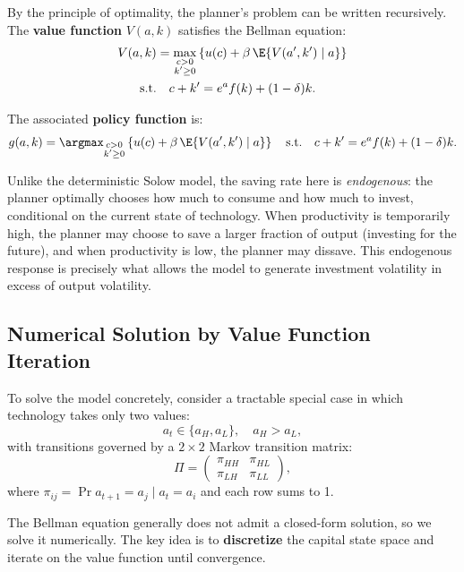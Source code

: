 By the principle of optimality, the planner's problem can be written recursively. The \textbf{value function} $V(a, k)$ satisfies the Bellman equation:
$$
\begin{aligned}
    V(a, k) & =  \max_{\substack{c > 0 \\ k' \geq 0}} \left\{ u(c) + \beta\, \E{V(a', k') \mid a} \right\}\\
\text{s.t.} &  \quad c + k' = e^a f(k) + (1-\delta) k.
\end{aligned}
$$

\noindent The associated \textbf{policy function} is:
$$
g(a, k) = \argmax_{\substack{c > 0 \\ k' \geq 0}} \left\{ u(c) + \beta\, \E{V(a', k') \mid a} \right\} \quad \text{s.t.} \quad c + k' = e^a f(k) + (1-\delta) k.
$$

Unlike the deterministic Solow model, the saving rate here is \textit{endogenous}: the planner optimally chooses how much to consume and how much to invest, conditional on the current state of technology. When productivity is temporarily high, the planner may choose to save a larger fraction of output (investing for the future), and when productivity is low, the planner may dissave. This endogenous response is precisely what allows the model to generate investment volatility in excess of output volatility.

\subsection{Numerical Solution by Value Function Iteration}

To solve the model concretely, consider a tractable special case in which technology takes only two values:
$$
a_t \in \{a_H, a_L\}, \quad a_H > a_L,
$$
with transitions governed by a $2 \times 2$ Markov transition matrix:
$$
\Pi = \begin{pmatrix} \pi_{HH} & \pi_{HL} \\ \pi_{LH} & \pi_{LL} \end{pmatrix},
$$
where $\pi_{ij} = \Pr{a_{t+1} = a_j \mid a_t = a_i}$ and each row sums to 1.


The Bellman equation generally does not admit a closed-form solution, so we solve it numerically. The key idea is to \textbf{discretize} the capital state space and iterate on the value function until convergence.

